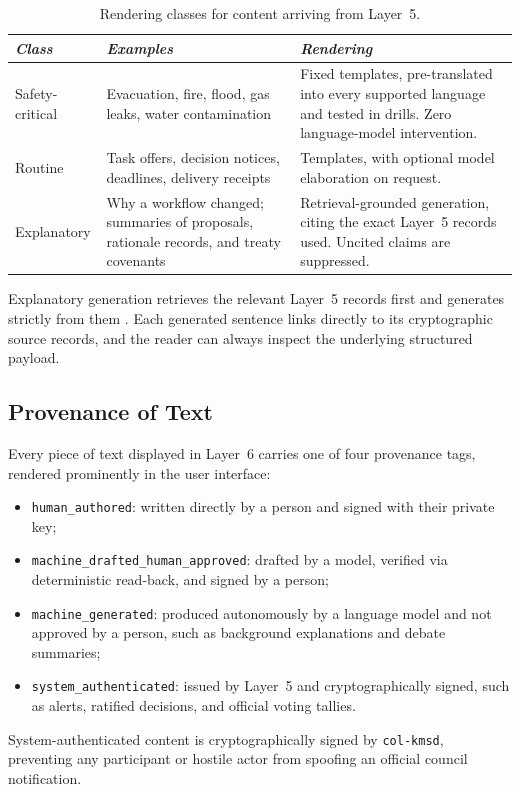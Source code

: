 \begin{table}[htbp]
\centering
\small
\begin{tabular}{|p{}|p{}|p{}|}
\hline
\textit{Class} & \textit{Examples} & \textit{Rendering} \\
\hline
Safety-critical & Evacuation, fire, flood, gas leaks, water contamination & Fixed templates, pre-translated into every supported language and tested in drills. Zero language-model intervention. \\
\hline
Routine & Task offers, decision notices, deadlines, delivery receipts & Templates, with optional model elaboration on request. \\
\hline
Explanatory & Why a workflow changed; summaries of proposals, rationale records, and treaty covenants & Retrieval-grounded generation, citing the exact Layer~5 records used. Uncited claims are suppressed. \\
\hline
\end{tabular}
\caption{Rendering classes for content arriving from Layer~5.}
\label{tab:l6-render}
\end{table}

Explanatory generation retrieves the relevant Layer~5 records first and generates strictly from them \parencite{lewis2020rag}. Each generated sentence links directly to its cryptographic source records, and the reader can always inspect the underlying structured payload.

\subsection{Provenance of Text}
\label{sec:l6-provenance}

Every piece of text displayed in Layer~6 carries one of four provenance tags, rendered prominently in the user interface:
\begin{itemize}
  \item \texttt{human\_authored}: written directly by a person and signed with their private key;
  \item \texttt{machine\_drafted\_human\_approved}: drafted by a model, verified via deterministic read-back, and signed by a person;
  \item \texttt{machine\_generated}: produced autonomously by a language model and not approved by a person, such as background explanations and debate summaries;
  \item \texttt{system\_authenticated}: issued by Layer~5 and cryptographically signed, such as alerts, ratified decisions, and official voting tallies.
\end{itemize}
System-authenticated content is cryptographically signed by \texttt{col-kmsd}, preventing any participant or hostile actor from spoofing an official council notification.

